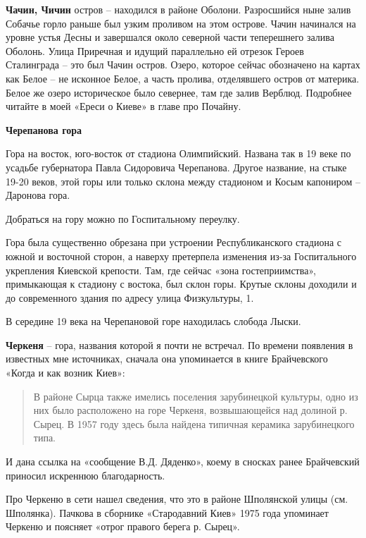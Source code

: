 \medskip

\textbf{Чачин, Чичин} остров – находился в районе Оболони. Разросшийся ныне залив Собачье горло раньше был узким проливом на этом острове. Чачин начинался на уровне устья Десны и завершался около северной части теперешнего залива Оболонь. Улица Приречная и идущий параллельно ей отрезок Героев Сталинграда – это был Чачин остров. Озеро, которое сейчас обозначено на картах как Белое – не исконное Белое, а часть пролива, отделявшего остров от материка. Белое же озеро историческое было севернее, там где залив Верблюд. Подробнее читайте в моей «Ереси о Киеве» в главе про Почайну.\\

\medskip

\textbf{Черепанова гора}

Гора на восток, юго-восток от стадиона Олимпийский. Названа так в 19 веке по усадьбе губернатора Павла Сидоровича Черепанова. Другое название, на стыке 19-20 веков, этой горы или только склона между стадионом и Косым капониром – Даронова гора. 

Добраться на гору можно по Госпитальному переулку. 

Гора была существенно обрезана при устроении Республиканского стадиона с южной и восточной сторон, а наверху претерпела изменения из-за Госпитального укрепления Киевской крепости. Там, где сейчас «зона гостеприимства», примыкающая к стадиону с востока, был склон горы. Крутые склоны доходили и до современного здания по адресу улица Физкультуры, 1.

В середине 19 века на Черепановой горе находилась слобода Лыски.\\

\medskip

\textbf{Черкеня} – гора, названия которой я почти не встречал. По времени появления в известных мне источниках, сначала она упоминается в книге Брайчевского «Когда и как возник Киев»:

\begin{quotation}
В районе Сырца также имелись поселения зарубинецкой культуры, одно из них было расположено на горе Черкеня, возвышающейся над долиной р. Сырец. В 1957 году здесь была найдена типичная керамика зарубинецкого типа.
\end{quotation}

И дана ссылка на «сообщение В.Д. Дяденко», коему в сносках ранее Брайчевский приносил искреннюю благодарность.

Про Черкеню в сети нашел сведения, что это в районе Шполянской улицы (см. Шполянка). Пачкова в сборнике «Стародавний Киев» 1975 года упоминает Черкеню и поясняет «отрог правого берега р. Сырец».

